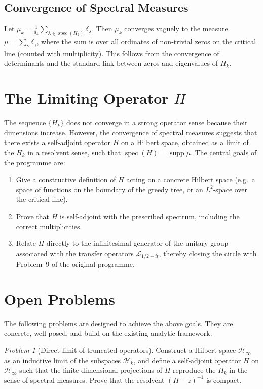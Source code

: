 \documentclass[11pt,a4paper]{article}
\theoremstyle{remark}
\newtheorem{problem}{Problem}[section]
\newcommand{\cL}{\mathcal{L}}
\newcommand{\cH}{\mathcal{H}}
\DeclareMathOperator{\spec}{spec}
\begin{document}
\subsection{Convergence of Spectral Measures}
Let $\mu_k = \frac{1}{d_k}\sum_{\lambda\in\spec(H_k)}\delta_\lambda$. Then $\mu_k$ converges vaguely to the measure $\mu = \sum_{\gamma} \delta_\gamma$, where the sum is over all ordinates of non‑trivial zeros on the critical line (counted with multiplicity). This follows from the convergence of determinants and the standard link between zeros and eigenvalues of $H_k$.

\section{The Limiting Operator $H$}
The sequence $\{H_k\}$ does not converge in a strong operator sense because their dimensions increase. However, the convergence of spectral measures suggests that there exists a self‑adjoint operator $H$ on a Hilbert space, obtained as a limit of the $H_k$ in a resolvent sense, such that $\spec(H)=\operatorname{supp}\mu$. The central goals of the programme are:
\begin{enumerate}[label=(\roman*)]
    \item Give a constructive definition of $H$ acting on a concrete Hilbert space (e.g.\ a space of functions on the boundary of the greedy tree, or an $L^2$‑space over the critical line).
    \item Prove that $H$ is self‑adjoint with the prescribed spectrum, including the correct multiplicities.
    \item Relate $H$ directly to the infinitesimal generator of the unitary group associated with the transfer operators $\cL_{1/2+it}$, thereby closing the circle with Problem~9 of the original programme.
\end{enumerate}

\section{Open Problems}
The following problems are designed to achieve the above goals. They are concrete, well‑posed, and build on the existing analytic framework.

\begin{problem}[Direct limit of truncated operators]
Construct a Hilbert space $\cH_\infty$ as an inductive limit of the subspaces $\cH_k$, and define a self‑adjoint operator $H$ on $\cH_\infty$ such that the finite‑dimensional projections of $H$ reproduce the $H_k$ in the sense of spectral measures. Prove that the resolvent $(H-z)^{-1}$ is compact.
\end{problem}
\end{document}
